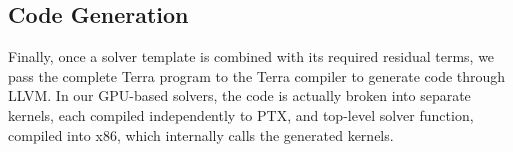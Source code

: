 
\subsection{Code Generation} %
\label{sub:codegen}

Finally, once a solver template is combined with its required residual terms, we pass the complete Terra program to the Terra compiler to generate code through LLVM. In our GPU-based solvers, the code is actually broken into separate kernels, each compiled independently to PTX, and top-level solver function, compiled into x86, which internally calls the generated kernels.


